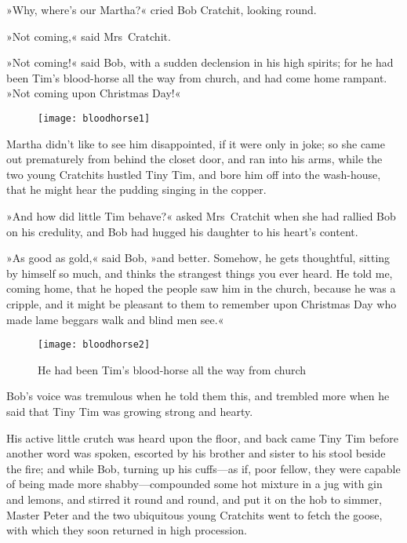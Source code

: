 »Why, where's our Martha?« cried Bob Cratchit, looking round.

»Not coming,« said Mrs~Cratchit.


»Not coming!« said Bob, with a sudden declension in his high spirits; for he had been Tim's blood-horse all the way from church, and had come home rampant. »Not coming upon Christmas Day!«


\begin{figure}[t!]
\centering
\texttt{[image: bloodhorse1]}
\end{figure}

Martha didn't like to see him disappointed, if it were only in joke; so she came out prematurely from behind the closet door, and ran into his arms, while the two young Cratchits hustled Tiny Tim, and bore him off into the wash-house, that he might hear the pudding singing in the copper.

»And how did little Tim behave?« asked Mrs~Cratchit when she had rallied Bob on his credulity, and Bob had hugged his daughter to his heart's content.


»As good as gold,« said Bob, »and better. Somehow, he gets  thoughtful, sitting by himself so much, and thinks the strangest things you ever heard. He told me, coming home, that he hoped the people saw him in the church, because he was a cripple, and it might be pleasant to them to remember upon Christmas Day who made lame beggars walk and blind men see.«

\begin{figure}[th!]
\centering
\texttt{[image: bloodhorse2]}
\caption{He had been Tim's blood-horse all the way from church}
\end{figure}

Bob's voice was tremulous when he told them this, and trem\-bled more when he said that Tiny Tim was growing strong and hearty.

His active little crutch was heard upon the floor, and back came Tiny Tim before another word was spoken, escorted by his brother and sister to his stool beside the fire; and while Bob, turning up his cuffs---as if, poor fellow, they were capable of being made more shabby---compounded some hot mixture in a jug with gin and lemons, and stirred it round and round, and put it on the hob to simmer, Master Peter and the two ubiquitous young Cratchits went to fetch the goose, with which they soon returned in high procession.



